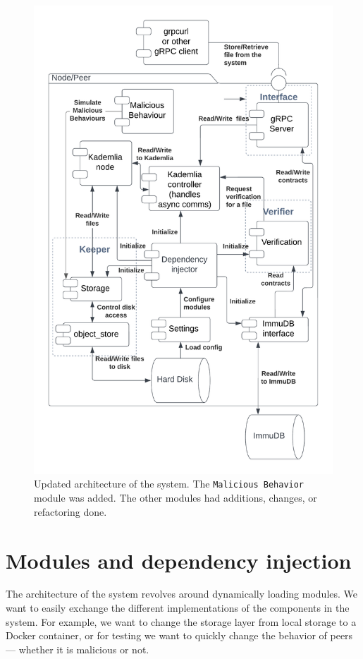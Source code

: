 \begin{figure}
    \centering
    \includegraphics[width=1\textwidth]{gfx/architecture.png}
    \caption{Updated architecture of the system. The \texttt{Malicious Behavior} module was added. The other modules had additions, changes, or refactoring done.}
    \label{fig:architecture}
\end{figure}

\section{Modules and dependency injection}

The architecture of the system revolves around dynamically loading modules.
We want to easily exchange the different implementations of the components in the system.
For example, we want to change the storage layer from local storage to a Docker container,
or for testing we want to quickly change the behavior of peers --- whether it is malicious or not.

